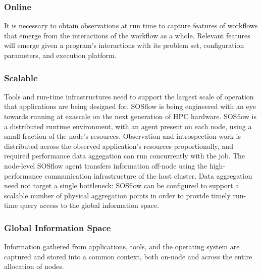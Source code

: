 \subsubsection{Online}
%
It is necessary to obtain observations at run time to capture features
of workflows that emerge from the interactions of the workflow as a
whole.
%
Relevant features will emerge given a program's interactions
with its problem set, configuration parameters, and execution platform.
%
\subsubsection{Scalable}
%
Tools and run-time infrastructures need to support the largest scale of
operation that applications are being designed for.
%
SOSflow is being engineered with an eye towards running at exascale
on the next generation of HPC hardware.
%
SOSflow is a distributed runtime environment, with an agent present
on each node, using a small fraction of the node's resources.
%
Observation and introspection work is distributed across
the observed application's resources proportionally, and required
performance data aggegation can run concurrently with the job.
%
The node-level SOSflow agent transfers information off-node using
the high-performance communication infrastructure of the host cluster.
%
Data aggregation need not target a single bottleneck: SOSflow can
be configured to support a scalable number of physical aggregation
points in order to provide timely run-time query access to the global
information space.
%
\subsubsection{Global Information Space}
       Information gathered from applications, tools, and the
       operating system are captured and stored into a common context,
       both on-node and across the entire allocation of nodes.

